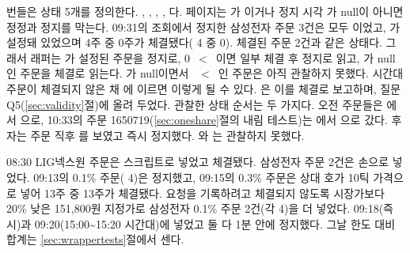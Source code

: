  번들은 상태 5개를 정의한다. , , , , 다. 페이지는 가 이거나 정지 시각 가 null이 아니면 정정과 정지를 막는다. 09:31의  조회에서 정지한 삼성전자 주문 3건은 모두 이었고, 가 설정돼 있었으며 4주 중 0주가 체결됐다( 4 중  0). 체결된 주문 2건과 같은 상태다. 그래서 래퍼는 가 설정된  주문을 정지로, 0~$<$~이면 일부 체결 후 정지로 읽고, 가 null인  주문을 체결로 읽는다. 가 null이면서 ~$<$~인  주문은 아직 관찰하지 못했다. 시간대 주문이 체결되지 않은 채 에 이르면 이렇게 될 수 있다. 은 이를 체결로 보고하며, 질문 Q5(\ref{sec:validity}절)에 올려 두었다. 관찰한 상태 순서는 두 가지다. 오전 주문들은 에서 으로, 10:33의 주문 1650719(\ref{sec:oneshare}절의 내림 테스트)는 에서 으로 갔다. 후자는 주문 직후 를 보였고 즉시 정지했다. 와 는 관찰하지 못했다.

 08:30 LIG넥스원 주문은 스크립트로 넣었고 체결됐다. 삼성전자 주문 2건은 손으로 넣었다. 09:13의 0.1\% 주문( 4)은 정지했고, 09:15의 0.3\% 주문은 상대 호가 10틱 가격으로 넣어 13주 중 13주가 체결됐다. 요청을 기록하려고 체결되지 않도록 시장가보다 20\% 낮은 151,800원 지정가로 삼성전자 0.1\% 주문 2건(각  4)을 더 넣었다. 09:18(즉시)과 09:20(15:00\textasciitilde 15:20 시간대)에 넣었고 둘 다 1분 안에 정지했다. 그날 한도 대비 합계는 \ref{sec:wrappertests}절에서 센다.

